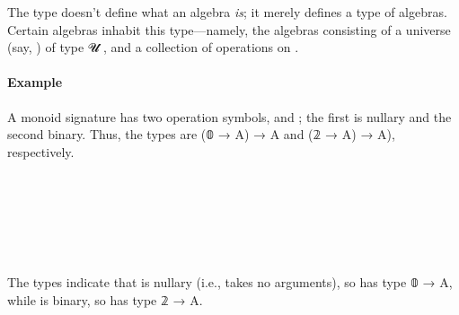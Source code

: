 \documentclass[a4paper,UKenglish,cleveref, autoref, thm-restate]{lipics-v2019}
\begin{document}
The type \algebraUS doesn't define what an algebra \emph{is}; it merely defines a type of algebras. Certain algebras inhabit this type---namely, the algebras consisting of a universe (say, ) of type \ab 𝓤 ̇, and a collection \AgdaSymbol{(}\AgdaSpace{}\AgdaSymbol{:}\AgdaSpace{}\AgdaSpace{}%
\AgdaSpace{}\AgdaSymbol{)}\AgdaSpace{}\AgdaSpace{}\AgdaSpace{}\AgdaSymbol{(}\AgdaSpace{}\AgdaSpace{}\AgdaSpace{}\AgdaSymbol{)}\AgdaSpace{}\AgdaSymbol{)}
of operations on .

\paragraph*{Example} A monoid signature has two operation symbols,  and ; the first is nullary and the second binary. Thus, the types are (𝟘 → A) → A and (𝟚 → A) → A), respectively.
\begin{code}%
\>[0]\AgdaSpace{}%
\AgdaSpace{}%
\AgdaSymbol{:}\AgdaSpace{}%
\AgdaSpace{}%
\AgdaSpace{}%
\<%
\\
\>[0][@{}l@{\AgdaIndent{0}}]%
\>[1]\AgdaSpace{}%
\AgdaSymbol{:}\AgdaSpace{}%
\<%
\\
%
\>[1]\AgdaSpace{}%
\AgdaSymbol{:}\AgdaSpace{}%
\<%
\\
%
\\[\AgdaEmptyExtraSkip]%
\>[0]\AgdaSpace{}%
\AgdaSymbol{:}\AgdaSpace{}%
\AgdaSpace{}%
\AgdaSymbol{\AgdaUnderscore{}}\AgdaSpace{}%
\AgdaSymbol{\AgdaUnderscore{}}\<%
\\
\>[0]\AgdaSpace{}%
\AgdaSymbol{=}\AgdaSpace{}%
\AgdaSpace{}%
\AgdaOperator{\AgdaInductiveConstructor{,}}\AgdaSpace{}%
\AgdaSpace{}%
\AgdaSymbol{\{}\AgdaSpace{}%
\AgdaSpace{}%
\AgdaSpace{}%
\AgdaSymbol{;}\AgdaSpace{}%
\AgdaSpace{}%
\AgdaSpace{}%
\AgdaSpace{}%
\AgdaSymbol{\}}\<%
\end{code}
The types indicate that  is nullary (i.e., takes no arguments), so has type 𝟘 → A, while  is binary, so has type 𝟚 → A.
\end{document}
